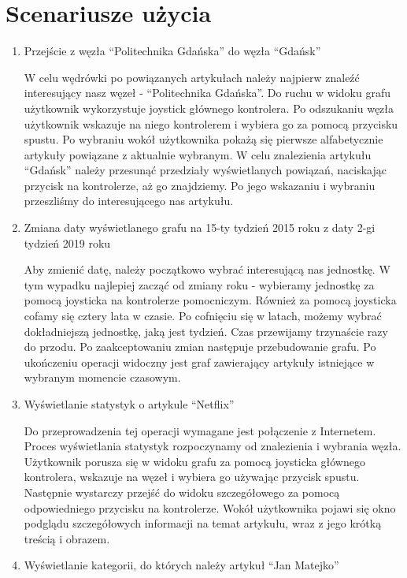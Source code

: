 \section{Scenariusze użycia}
\begin{enumerate}
\item Przejście z węzła ``Politechnika Gdańska'' do węzła ``Gdańsk''

	W celu wędrówki po powiązanych artykułach należy najpierw znaleźć interesujący nasz węzeł - ``Politechnika Gdańska''. Do ruchu w widoku grafu użytkownik wykorzystuje joystick głównego kontrolera. Po odszukaniu węzła użytkownik wskazuje na niego kontrolerem i wybiera go za pomocą przycisku spustu. Po wybraniu wokół użytkownika pokażą się pierwsze alfabetycznie artykuły powiązane z aktualnie wybranym. W celu znalezienia artykułu ``Gdańsk'' należy przesunąć przedziały wyświetlanych powiązań, naciskając przycisk na kontrolerze, aż go znajdziemy. Po jego wskazaniu i wybraniu przeszliśmy do interesującego nas artykułu.
	
\item Zmiana daty wyświetlanego grafu na 15-ty tydzień  2015 roku z daty 2-gi tydzień 2019 roku

	Aby zmienić datę, należy początkowo wybrać interesującą nas jednostkę. W tym wypadku najlepiej zacząć od zmiany roku - wybieramy jednostkę za pomocą joysticka na kontrolerze pomocniczym. Również za pomocą joysticka cofamy się cztery lata w czasie. Po cofnięciu się w latach, możemy wybrać dokładniejszą jednostkę, jaką jest tydzień. Czas przewijamy trzynaście razy do przodu. Po zaakceptowaniu zmian następuje przebudowanie grafu. Po ukończeniu operacji widoczny jest graf zawierający artykuły istniejące w wybranym momencie czasowym.
	
\item Wyświetlanie statystyk o artykule ``Netflix''

	Do przeprowadzenia tej operacji wymagane jest połączenie z Internetem. Proces wyświetlania statystyk rozpoczynamy od znalezienia i wybrania węzła. Użytkownik porusza się w widoku grafu za pomocą joysticka głównego kontrolera, wskazuje na węzeł i wybiera go używając przycisk spustu. Następnie wystarczy przejść do widoku szczegółowego za pomocą odpowiedniego przycisku na kontrolerze. Wokół użytkownika pojawi się okno podglądu szczegółowych informacji na temat artykułu, wraz z jego krótką treścią i obrazem.
	
\item Wyświetlanie kategorii, do których należy artykuł ``Jan Matejko''


\end{enumerate}
